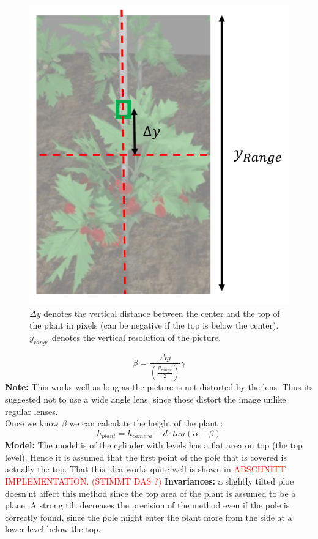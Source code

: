    \begin{figure}[H]
       \centering
       \includegraphics[scale=0.6]{getTopAngle.PNG}
       \caption{$\Delta y$ denotes the vertical distance between the center and the top of the plant in pixels (can be negative if the top is below the center). $y_{range}$ denotes the vertical resolution of the picture.}
       \label{fig:getTopAngle}
   \end{figure}
$$\beta = \frac{\Delta y}{(\frac{y_{range}}{2})}\gamma$$
\textbf{Note:} This works well as long as the picture is not distorted by the lens. Thus its suggested not to use a wide angle lens, since those distort the image unlike regular lenses.\\
Once we know $\beta$ we can calculate the height of the plant :
$$h_{plant} = h_{camera} - d\cdot tan(\alpha - \beta)$$
\textbf{Model:} The model is of the cylinder with levels has a flat area on top (the top level). Hence it is assumed that the first point of the pole that is covered is actually the top. That this idea works quite well is shown in \textcolor{red}{ABSCHNITT IMPLEMENTATION. (STIMMT DAS ?)}
\textbf{Invariances:} a slightly tilted ploe doesn'nt affect this method since the top area of the plant is assumed to be a plane. A strong tilt decreases the precision of the method even if the pole is correctly found, since the pole might enter the plant more from the side at a lower level below the top.
